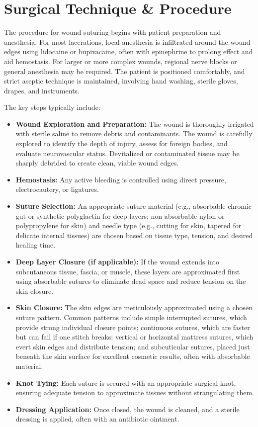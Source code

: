 \section*{Surgical Technique \& Procedure}
The procedure for wound suturing begins with patient preparation and anesthesia. For most lacerations, local anesthesia is infiltrated around the wound edges using lidocaine or bupivacaine, often with epinephrine to prolong effect and aid hemostasis. For larger or more complex wounds, regional nerve blocks or general anesthesia may be required. The patient is positioned comfortably, and strict aseptic technique is maintained, involving hand washing, sterile gloves, drapes, and instruments.

The key steps typically include:

\begin{itemize}
  \item \textbf{Wound Exploration and Preparation:} The wound is thoroughly irrigated with sterile saline to remove debris and contaminants. The wound is carefully explored to identify the depth of injury, assess for foreign bodies, and evaluate neurovascular status. Devitalized or contaminated tissue may be sharply debrided to create clean, viable wound edges.
  
  \item \textbf{Hemostasis:} Any active bleeding is controlled using direct pressure, electrocautery, or ligatures.
  
  \item \textbf{Suture Selection:} An appropriate suture material (e.g., absorbable chromic gut or synthetic polyglactin for deep layers; non-absorbable nylon or polypropylene for skin) and needle type (e.g., cutting for skin, tapered for delicate internal tissues) are chosen based on tissue type, tension, and desired healing time.
  
  \item \textbf{Deep Layer Closure (if applicable):} If the wound extends into subcutaneous tissue, fascia, or muscle, these layers are approximated first using absorbable sutures to eliminate dead space and reduce tension on the skin closure.
  
  \item \textbf{Skin Closure:} The skin edges are meticulously approximated using a chosen suture pattern. Common patterns include simple interrupted sutures, which provide strong individual closure points; continuous sutures, which are faster but can fail if one stitch breaks; vertical or horizontal mattress sutures, which evert skin edges and distribute tension; and subcuticular sutures, placed just beneath the skin surface for excellent cosmetic results, often with absorbable material.
  
  \item \textbf{Knot Tying:} Each suture is secured with an appropriate surgical knot, ensuring adequate tension to approximate tissues without strangulating them.
  
  \item \textbf{Dressing Application:} Once closed, the wound is cleaned, and a sterile dressing is applied, often with an antibiotic ointment.
\end{itemize}

